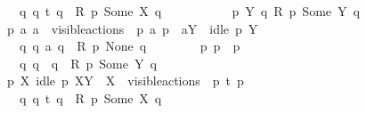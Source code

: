\begin{isabellebody}
\ \ \ \ \ \ \ \ {\isacharparenleft}{\kern0pt}{\isasymexists}\ q{\isacharprime}{\kern0pt}{\isachardot}{\kern0pt}\ q\ {\isasymlongmapsto}t\ q{\isacharprime}{\kern0pt}\ {\isasymand}\ R\ p{\isacharprime}{\kern0pt}\ {\isacharparenleft}{\kern0pt}Some\ X{\isacharparenright}{\kern0pt}\ q{\isacharprime}{\kern0pt}{\isacharparenright}{\kern0pt}{\isacharparenright}{\kern0pt}{\isacharparenright}{\kern0pt}\ {\isasymand}\isanewline
\ \ \ \ \isanewline
\ \ \ \ {\isacharparenleft}{\kern0pt}{\isasymforall}\ p\ Y\ q{\isachardot}{\kern0pt}\ R\ p\ {\isacharparenleft}{\kern0pt}Some\ Y{\isacharparenright}{\kern0pt}\ q\ {\isasymlongrightarrow}\isanewline
\ \ \ \ \ \ {\isacharparenleft}{\kern0pt}{\isasymforall}\ p{\isacharprime}{\kern0pt}\ a{\isachardot}{\kern0pt}\ a\ {\isasymin}\ visible{\isacharunderscore}{\kern0pt}actions\ {\isasymand}\ p\ {\isasymlongmapsto}a\ p{\isacharprime}{\kern0pt}\ {\isasymand}\ {\isacharparenleft}{\kern0pt}a{\isasymin}Y\ {\isasymor}\ idle\ p\ Y{\isacharparenright}{\kern0pt}\ {\isasymlongrightarrow}\isanewline
\ \ \ \ \ \ \ \ {\isacharparenleft}{\kern0pt}{\isasymexists}\ q{\isacharprime}{\kern0pt}{\isachardot}{\kern0pt}\ q\ {\isasymlongmapsto}a\ q{\isacharprime}{\kern0pt}\ {\isasymand}\ R\ p{\isacharprime}{\kern0pt}\ None\ q{\isacharprime}{\kern0pt}{\isacharparenright}{\kern0pt}{\isacharparenright}{\kern0pt}\ {\isasymand}\isanewline
\ \ \ \ \ \ {\isacharparenleft}{\kern0pt}{\isasymforall}\ p{\isacharprime}{\kern0pt}{\isachardot}{\kern0pt}\ p\ {\isasymlongmapsto}{\isasymtau}\ p{\isacharprime}{\kern0pt}\ \ {\isasymlongrightarrow}\ \ \isanewline
\ \ \ \ \ \ \ \ {\isacharparenleft}{\kern0pt}{\isasymexists}\ q{\isacharprime}{\kern0pt}{\isachardot}{\kern0pt}\ q\ {\isasymlongmapsto}{\isasymtau}\ q{\isacharprime}{\kern0pt}\ {\isasymand}\ R\ p{\isacharprime}{\kern0pt}\ {\isacharparenleft}{\kern0pt}Some\ Y{\isacharparenright}{\kern0pt}\ q{\isacharprime}{\kern0pt}{\isacharparenright}{\kern0pt}{\isacharparenright}{\kern0pt}\ {\isasymand}\isanewline
\ \ \ \ \ \ {\isacharparenleft}{\kern0pt}{\isasymforall}\ p{\isacharprime}{\kern0pt}\ X{\isachardot}{\kern0pt}\ idle\ p\ {\isacharparenleft}{\kern0pt}X{\isasymunion}Y{\isacharparenright}{\kern0pt}\ {\isasymand}\ X\ {\isasymsubseteq}\ visible{\isacharunderscore}{\kern0pt}actions\ {\isasymand}\ p\ {\isasymlongmapsto}t\ p{\isacharprime}{\kern0pt}\ \ {\isasymlongrightarrow}\ \ \isanewline
\ \ \ \ \ \ \ \ {\isacharparenleft}{\kern0pt}{\isasymexists}\ q{\isacharprime}{\kern0pt}{\isachardot}{\kern0pt}\ q\ {\isasymlongmapsto}t\ q{\isacharprime}{\kern0pt}\ {\isasymand}\ R\ p{\isacharprime}{\kern0pt}\ {\isacharparenleft}{\kern0pt}Some\ X{\isacharparenright}{\kern0pt}\ q{\isacharprime}{\kern0pt}{\isacharparenright}{\kern0pt}{\isacharparenright}{\kern0pt}{\isacharparenright}{\kern0pt}{\isacartoucheclose}\isanewline

\end{isabellebody}
